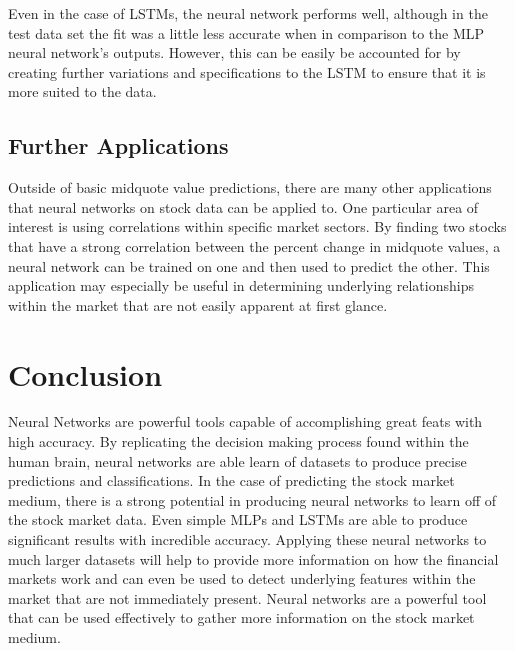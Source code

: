 Even in the case of LSTMs, the neural network performs well, although in the test data set the fit was a little less accurate when in comparison to the MLP neural network's outputs. However, this can be easily be accounted for by creating further variations and specifications to the LSTM to ensure that it is more suited to the data.
\subsection{Further Applications}\label{sec:data}

Outside of basic midquote value predictions, there are many other applications that neural networks on stock data can be applied to. One particular area of interest is using correlations within specific market sectors. By finding two stocks that have a strong correlation between the percent change in midquote values, a neural network can be trained on one and then used to predict the other. This application may especially be useful in determining underlying relationships within the market that are not easily apparent at first glance.  

\section{Conclusion}

Neural Networks are powerful tools capable of accomplishing great feats with high accuracy. By replicating the decision making process found within the human brain, neural networks are able learn of datasets to produce precise predictions and classifications. In the case of predicting the stock market medium, there is a strong potential in producing  neural networks to learn off of the stock market data. Even simple MLPs and LSTMs are able to produce significant results with incredible accuracy. Applying these neural networks to much larger datasets will help to provide more information on how the financial markets work and can even be used to detect underlying features within the market that are not immediately present. Neural networks are a powerful tool that can be used effectively to gather more information on the stock market medium. 

